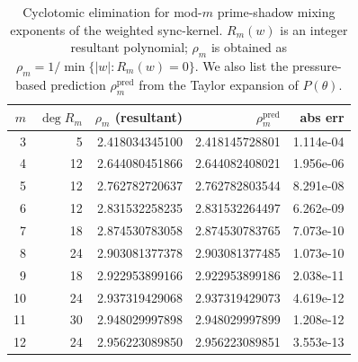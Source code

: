 \begin{table}[H]
\centering
\scriptsize
\setlength{\tabcolsep}{6pt}
\caption{Cyclotomic elimination for mod-$m$ prime-shadow mixing exponents of the weighted sync-kernel. $R_m(w)$ is an integer resultant polynomial; $\rho_m$ is obtained as $\rho_m=1/\min\{|w|:R_m(w)=0\}$. We also list the pressure-based prediction $\rho_m^{\mathrm{pred}}$ from the Taylor expansion of $P(\theta)$.}
\label{tab:sync_kernel_cyclotomic_elimination_summary}
\begin{tabular}{r r r r r}
\toprule
$m$ & $\deg R_m$ & $\rho_m$ (resultant) & $\rho_m^{\mathrm{pred}}$ & abs err\\
\midrule
3 & 5 & 2.418034345100 & 2.418145728801 & 1.114e-04\\
4 & 12 & 2.644080451866 & 2.644082408021 & 1.956e-06\\
5 & 12 & 2.762782720637 & 2.762782803544 & 8.291e-08\\
6 & 12 & 2.831532258235 & 2.831532264497 & 6.262e-09\\
7 & 18 & 2.874530783058 & 2.874530783765 & 7.073e-10\\
8 & 24 & 2.903081377378 & 2.903081377485 & 1.073e-10\\
9 & 18 & 2.922953899166 & 2.922953899186 & 2.038e-11\\
10 & 24 & 2.937319429068 & 2.937319429073 & 4.619e-12\\
11 & 30 & 2.948029997898 & 2.948029997899 & 1.208e-12\\
12 & 24 & 2.956223089850 & 2.956223089851 & 3.553e-13\\
\bottomrule
\end{tabular}
\end{table}
